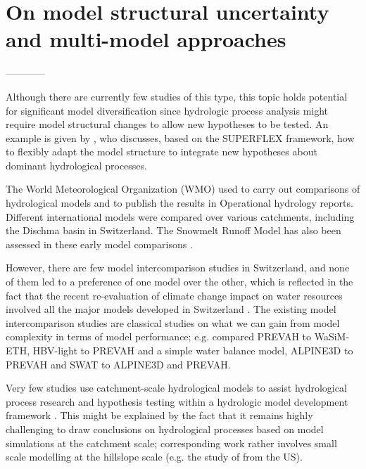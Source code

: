 \documentclass[10pt,a4paper]{article}
\begin{document}
\section{On model structural uncertainty and multi-model approaches}
\label{sec:multi-model}


------------

Although there are currently few studies of this type, this topic holds potential for significant model diversification since hydrologic process analysis might require model structural changes to allow new hypotheses to be tested. An example is given by \citet{DalMolin2020}, who discusses, based on the SUPERFLEX framework, how to flexibly adapt the model structure to integrate new hypotheses about dominant hydrological processes.

The World Meteorological Organization (WMO) used to carry out comparisons of hydrological models and to publish the results in Operational hydrology reports. Different international models were compared over various catchments, including the Dischma basin in Switzerland. The Snowmelt Runoff Model \citep[SRM,][see supplementary material]{martinec1975} has also been assessed in these early model comparisons \citep{WMO1986, WMO1992}.

However, there are few model intercomparison studies in Switzerland, and none of them led to a preference of one model over the other, which is reflected in the fact that the recent re-evaluation of climate change impact on water resources involved all the major models developed in Switzerland  \citep{bafu2021}. The existing model intercomparison studies are classical studies on what we can gain from model complexity in terms of model performance; e.g. \citet{Gurtz2003} compared PREVAH to WaSiM-ETH, \citet{Orth2015} HBV-light to PREVAH and a simple water balance model, \citet{Kobierska_2013} ALPINE3D to PREVAH and \citet{Andrianaki2019} SWAT to ALPINE3D and PREVAH.

Very few studies use catchment-scale hydrological models to assist hydrological process research and hypothesis testing within a hydrologic model development framework \citep{clarkOpinion2016}. This might be explained by the fact that it remains highly challenging to draw conclusions on hydrological processes based on model simulations at the catchment scale; corresponding work rather involves small scale modelling at the hillslope scale (e.g. the study of \citealt{Heuvel2018} from the US).  

\end{document}
